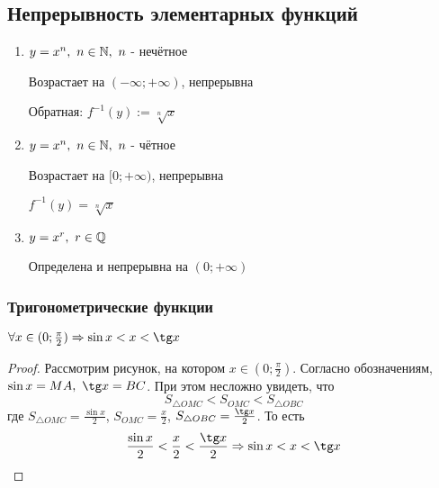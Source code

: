 \subsection{Непрерывность элементарных функций}

\begin{enumerate}
	\item $y = x^n,\ n \in \mathbb{N},\ n$ - нечётное
	
	Возрастает на $(-\infty; +\infty)$, непрерывна
	
	Обратная: $f^{-1}(y) := \sqrt[n]{x}$
	
	\item $y = x^n,\ n \in \mathbb{N},\ n$ - чётное
	
	Возрастает на $[0; +\infty)$, непрерывна
	
	$f^{-1}(y) = \sqrt[n]{x}$
	
	\item $y = x^r,\ r \in \mathbb{Q}$
	
	Определена и непрерывна на $(0; +\infty)$
\end{enumerate}

\subsubsection*{Тригонометрические функции}

\begin{lemma} \label{for_trig}
	$\forall x \in (0; \frac{\pi}{2}) \Ra \sin x < x < \tg x$
\end{lemma}


\begin{proof}
	Рассмотрим рисунок, на котором $x \in (0; \frac{\pi}{2})$. Согласно обозначениям, $\sin x = MA,\ \tg x = BC$. При этом несложно увидеть, что
	\[
		S_{\triangle OMC} < S_{OMC} < S_{\triangle OBC}
	\]
	где $S_{\triangle OMC} = \frac{\sin x}{2}$, $S_{OMC} = \frac{x}{2}$, $S_{\triangle OBC} = \frac{\tg x}{2}$. То есть
	\[
		\frac{\sin x}{2} < \frac{x}{2} < \frac{\tg x}{2} \Ra \sin x < x < \tg x
	\]
\end{proof}